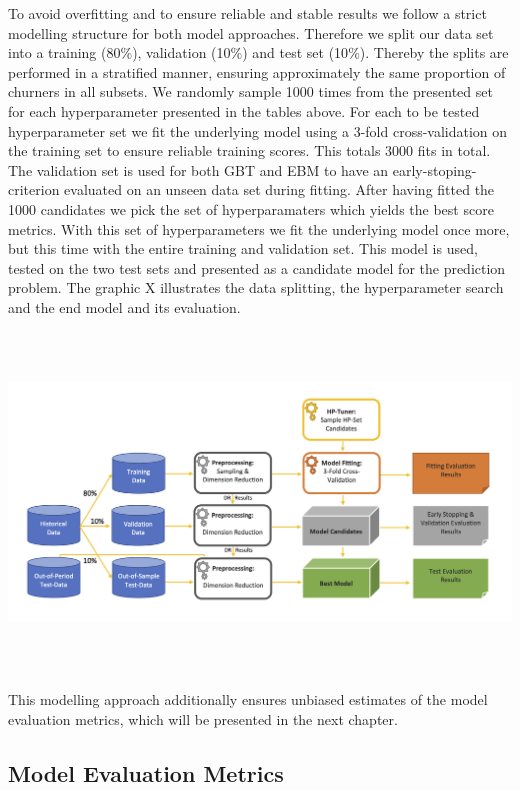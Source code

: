 \documentclass[12pt,titlepage]{article}
\begin{document}
To avoid overfitting and to ensure reliable and stable results we follow a strict modelling structure for both model approaches. Therefore we split our data set into a training (80$\%$), validation (10$\%$) and test set (10$\%$). Thereby the splits are performed in a stratified manner, ensuring approximately the same proportion of churners in all subsets. We randomly sample 1000 times from the presented set for each hyperparameter presented in the tables above. For each to be tested hyperparameter set we fit the underlying model using a 3-fold cross-validation on the training set to ensure reliable training scores. This totals 3000 fits in total. \\
The validation set is used for both GBT and EBM to have an early-stoping-criterion evaluated on an unseen data set during fitting. After having fitted the 1000 candidates we pick the set of hyperparamaters which yields the best score metrics. With this set of hyperparameters we fit the underlying model once more, but this time with the entire training and validation set. This model is used, tested on the two test sets and presented as a candidate model for the prediction problem. The graphic X illustrates the data splitting, the hyperparameter search and the end model and its evaluation. \\
\centerline{\includegraphics[height=9cm]{fitting_tuning_viz.png}}
This modelling approach additionally ensures unbiased estimates of the model evaluation metrics, which will be presented in the next chapter. \\


\subsection{Model Evaluation Metrics} \par
\end{document}
